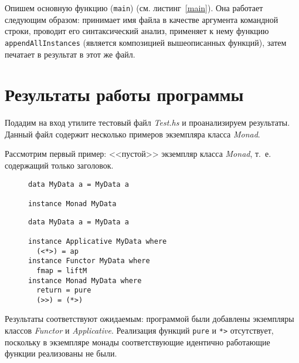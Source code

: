 Опишем основную функцию (\lstinline{main}) (см. листинг~\ref{main}). Она работает следующим образом: принимает имя файла в качестве аргумента командной строки, проводит его синтаксический анализ, применяет к нему функцию \lstinline{appendAllInstances} (является композицией вышеописанных функций), затем печатает в результат в этот же файл.


\newpage
\chapter{Результаты работы программы}
Подадим на вход утилите тестовый файл \textit{Test.hs} и проанализируем результаты. Данный файл содержит несколько примеров экземпляра класса \textit{Monad}.

Рассмотрим первый пример: <<пустой>> экземпляр класса \textit{Monad}, т.~е. содержащий только заголовок.
\begin{figure}[H]
\begin{parcolumns}{2}
\end{parcolumns}

\begin{minipage}{.45\textwidth}
\begin{lstlisting}
data MyData a = MyData a

instance Monad MyData
\end{lstlisting}
\end{minipage}
\begin{minipage}{.45\textwidth}
\begin{lstlisting}
data MyData a = MyData a

instance Applicative MyData where
  (<*>) = ap  
instance Functor MyData where
  fmap = liftM  
instance Monad MyData where
  return = pure
  (>>) = (*>)
\end{lstlisting}
\end{minipage}
\end{figure}
Результаты соответствуют ожидаемым: программой были добавлены экземпляры классов \textit{Functor} и \textit{Applicative}. Реализация функций \lstinline{pure} и \lstinline{*>} отсутствует, поскольку в экземпляре монады соответствующие идентично работающие функции реализованы не были.

